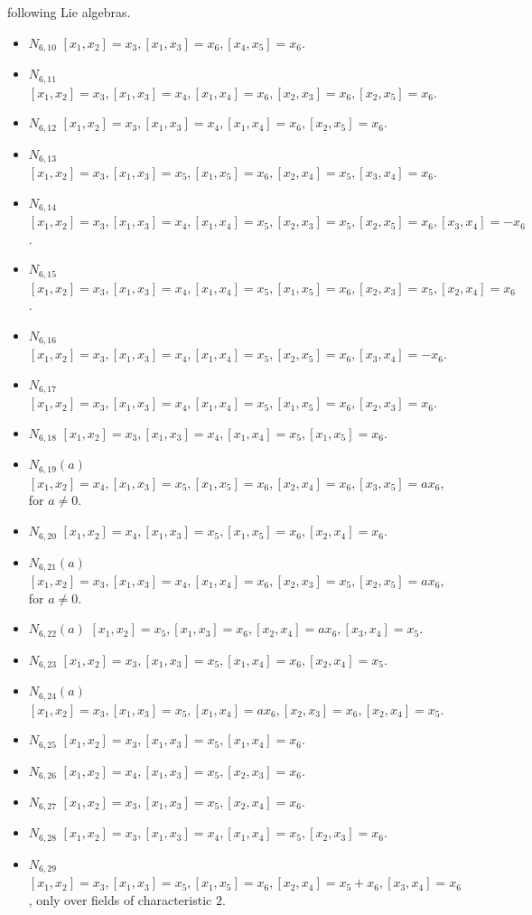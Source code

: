\documentclass[a4paper,11pt]{report}
\begin{document}
{{following Lie algebras. 
\begin{itemize}
\item  $N_{6,10}$ $[x_1,x_2]=x_3, [x_1,x_3]=x_6, [x_4,x_5]=x_6.$ 
\item  $N_{6,11}$ $[x_1,x_2]=x_3, [x_1,x_3]=x_4, [x_1,x_4]=x_6, [x_2,x_3]=x_6, [x_2,x_5]=x_6$.
\item  $N_{6,12}$ $[x_1,x_2]=x_3, [x_1,x_3]=x_4, [x_1,x_4]=x_6, [x_2,x_5]=x_6$.
\item  $N_{6,13}$ $[x_1,x_2]=x_3, [x_1,x_3]=x_5, [x_1,x_5]=x_6, [x_2,x_4]=x_5, [x_3,x_4]=x_6$.
\item  $N_{6,14}$ $[x_1,x_2]=x_3, [x_1,x_3]=x_4, [x_1,x_4]=x_5, [x_2,x_3]=x_5,
[x_2,x_5]=x_6,[x_3,x_4]=-x_6$.
\item  $N_{6,15}$ $[x_1,x_2]=x_3, [x_1,x_3]=x_4, [x_1,x_4]=x_5, [x_1,x_5]=x_6, [x_2,x_3]=x_5,
[x_2,x_4]=x_6$.
\item  $N_{6,16}$ $[x_1,x_2]=x_3, [x_1,x_3]=x_4, [x_1,x_4]=x_5, [x_2,x_5]=x_6, [x_3,x_4]=-x_6$.
\item  $N_{6,17}$ $[x_1,x_2]=x_3, [x_1,x_3]=x_4, [x_1,x_4]=x_5, [x_1,x_5]=x_6, [x_2,x_3]= x_6$.
\item  $N_{6,18}$ $[x_1,x_2]=x_3, [x_1,x_3]=x_4, [x_1,x_4]=x_5, [x_1,x_5]=x_6$.
\item  $N_{6,19}(a)$ $[x_1,x_2]=x_4, [x_1,x_3]=x_5, [x_1,x_5]=x_6, [x_2,x_4]=x_6, [x_3,x_5]=a x_6$, for $a{\ensuremath{\neq}}0$.
\item  $N_{6,20}$ $[x_1,x_2]=x_4, [x_1,x_3]=x_5, [x_1,x_5]=x_6, [x_2,x_4]=x_6$.
\item  $N_{6,21}(a)$ $[x_1,x_2]=x_3, [x_1,x_3]=x_4, [x_1,x_4]=x_6, [x_2,x_3]=x_5, [x_2,x_5]= a x_6$, for $a{\ensuremath{\neq}}0$.
\item  $N_{6,22}(a)$ $[x_1,x_2]=x_5, [x_1,x_3]=x_6, [x_2,x_4]= a x_6, [x_3,x_4]=x_5$.
\item  $N_{6,23}$ $[x_1,x_2]=x_3, [x_1,x_3]=x_5, [x_1,x_4]=x_6, [x_2,x_4]= x_5$.
\item  $N_{6,24}(a)$ $[x_1,x_2]=x_3, [x_1,x_3]=x_5, [x_1,x_4]=a x_6, [x_2,x_3]=x_6, [x_2,x_4]= x_5$.
\item  $N_{6,25}$ $[x_1,x_2]=x_3, [x_1,x_3]=x_5, [x_1,x_4]=x_6$.
\item  $N_{6,26}$ $[x_1,x_2]=x_4, [x_1,x_3]=x_5, [x_2,x_3]=x_6$.
\item  $N_{6,27}$ $[x_1,x_2]=x_3, [x_1,x_3]=x_5, [x_2,x_4]= x_6$.
\item  $N_{6,28}$ $[x_1,x_2]=x_3, [x_1,x_3]=x_4, [x_1,x_4]=x_5, [x_2,x_3]=x_6$.
\item  $N_{6,29}$ $[x_1,x_2]=x_3, [x_1,x_3]=x_5, [x_1,x_5]=x_6, [x_2,x_4]=x_5+x_6, [x_3,x_4]=x_6$, only over fields of characteristic $2$.

\end{itemize}}}
\end{document}
